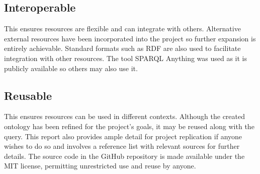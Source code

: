 \subsection{Interoperable}
\hspace{0.5cm} This ensures resources are flexible and can integrate with others. Alternative external resources have been incorporated into the project so further expansion is entirely achievable. Standard formats such as RDF are also used to facilitate integration with other resources. The tool SPARQL Anything was used as it is publicly available so others may also use it. 

\subsection{Reusable}
\hspace{0.5cm} This ensures resources can be used in different contexts. Although the created ontology has been refined for the project's goals, it may be reused along with the query. This report also provides ample detail for project replication if anyone wishes to do so and involves a reference list with relevant sources for further details. The source code in the GitHub repository is made available under the MIT license, permitting unrestricted use and reuse by anyone.
